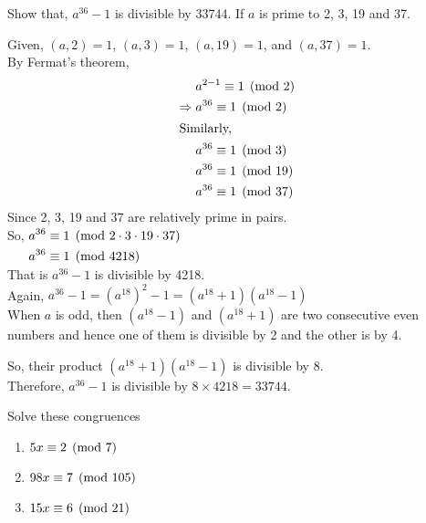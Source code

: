 \documentclass[12pt]{book}
\begin{document}
\begin{qn}
    Show that, $ a^{36}-1 $ is divisible by 33744. If $ a  $ is prime to 2, 3, 19 and 37.
\end{qn}
\begin{soln}
    Given, $ (a,2)=1 $, $ (a,3)=1 $, $ (a,19)=1 $, and $ (a,37)=1 $.\\
    By Fermat's theorem,
    \begin{align*}
        & a^{2-1}\equiv 1 \pmod{2}\\
        \Rightarrow\;& a^{36}\equiv 1 \pmod{2}\\
        \intertext{Similarly, }
        & a^{36}\equiv 1 \pmod{3}\\
        & a^{36}\equiv 1 \pmod{19}\\
        & a^{36}\equiv 1 \pmod{37}
    \end{align*}
    Since 2, 3, 19 and 37 are relatively prime in pairs.\\
    So, $ \begin{aligned}[t]
        a^{36} &\equiv 1 \pmod{2\cdot3\cdot19\cdot37}\\
        a^{36} &\equiv 1 \pmod{4218}
    \end{aligned} $\\
    That is $ a^{36}-1 $ is divisible by 4218.\\
    Again, $ a^{36}-1=\left( a^{18} \right)^2-1=(a^{18}+1)(a^{18}-1) $\\
    When $ a $ is odd, then $ (a^{18}-1) $ and $ (a^{18}+1) $ are two consecutive even numbers and hence one of them is divisible by 2 and the other is by 4.

    So, their product $ (a^{18}+1)(a^{18}-1) $ is divisible by 8.\\
    Therefore, $ a^{36}-1 $ is divisible by $ 8\times 4218=33744 $.
\end{soln}
\begin{qn}
    Solve these congruences
    \begin{enumerate}[label=(\alph*)]
        \item $ 5x\equiv 2 \pmod{7} $
        \item $ 98x\equiv 7 \pmod{105} $
        \item $ 15x\equiv 6 \pmod{21} $
    \end{enumerate}
\end{qn}
\end{document}
